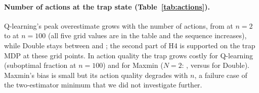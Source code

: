 \paragraph{Number of actions at the trap state (Table~\ref{tab:actions}).} Q-learning's peak overestimate grows with the number of actions, from  at $n=2$ to  at $n=100$ (all five grid values are in the table and the sequence increases), while Double stays between  and ; the second part of H4 is supported on the trap MDP at these grid points. In action quality the trap grows costly for Q-learning (suboptimal fraction  at $n=100$) and for Maxmin ($N=2$: , versus  for Double). Maxmin's bias is small but its action quality degrades with $n$, a failure case of the two-estimator minimum that we did not investigate further.

\begin{table}[t]\centering
\caption{Trap MDP with $n$ actions at state B (means over 5 seeds). Q, DQ, WDQ, MM: Q-learning, Double, Weighted Double, Maxmin. Left block: peak start-state overestimate; right block: suboptimal fraction over all episodes.}\label{tab:actions}
\resizebox{\columnwidth}{!}{}
\end{table}
